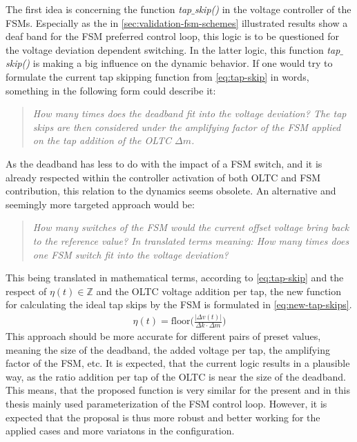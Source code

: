 The first idea is concerning the function \textit{tap$\_$skip()} in the voltage controller of the \acsp{FSM}.
Especially as the in \autoref{sec:validation-fsm-schemes} illustrated results show a deaf band for the \acs{FSM} preferred control loop, this logic is to be questioned for the voltage deviation dependent switching.
In the latter logic, this function \textit{tap$\_$skip()} is making a big influence on the dynamic behavior.
If one would try to formulate the current tap skipping function from \autoref{eq:tap-skip} in words, something in the following form could describe it: 
\begin{quote} \itshape
        How many times does the deadband fit into the voltage deviation? The tap skips are then considered under the amplifying factor of the \acs{FSM} applied on the tap addition of the \acs{OLTC} $\Delta m$.
\end{quote}
As the deadband has less to do with the impact of a \acs{FSM} switch, and it is already respected within the controller activation of both \acs{OLTC} and \acs{FSM} contribution, this relation to the dynamics seems obsolete.
An alternative and seemingly more targeted approach would be: 
\begin{quote} \itshape
        How many switches of the \acs{FSM} would the current offset voltage bring back to the reference value?
        In translated terms meaning: How many times does one \acs{FSM} switch fit into the voltage deviation?
\end{quote}
This being translated in mathematical terms, according to \autoref{eq:tap-skip} and the respect of $\eta(t) \in \mathbb{Z}$ and the \acs{OLTC} voltage addition per tap, the new function for calculating the ideal tap skips by the \acs{FSM} is formulated in \autoref{eq:new-tap-skips}.
\begin{align}
        \eta(t)=\text{floor}\bigg(\frac{\vert \Delta v(t)\vert}{\Delta k \cdot \Delta m}\bigg) \label{eq:new-tap-skips}
\end{align}
This approach should be more accurate for different pairs of preset values, meaning the size of the deadband, the added voltage per tap, the amplifying factor of the \acs{FSM}, etc.
It is expected, that the current logic results in a plausible way, as the ratio addition per tap of the \acs{OLTC} is near the size of the deadband.
This means, that the proposed function is very similar for the present and in this thesis mainly used parameterization of the \acs{FSM} control loop.
However, it is expected that the proposal is thus more robust and better working for the applied cases and more variatons in the configuration.

